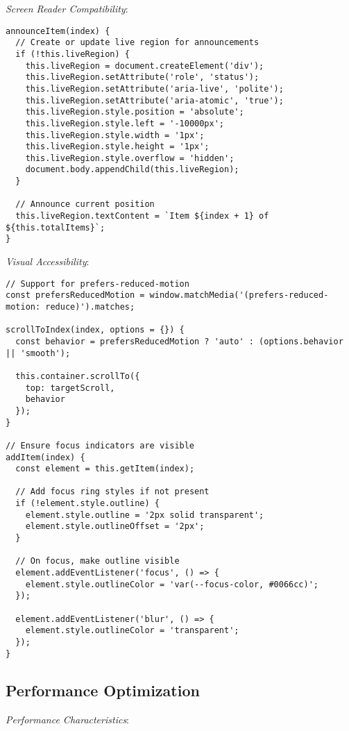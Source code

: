 \documentclass[11pt]{article}
\begin{document}
\emph{Screen Reader Compatibility}:

\begin{verbatim}
announceItem(index) {
  // Create or update live region for announcements
  if (!this.liveRegion) {
    this.liveRegion = document.createElement('div');
    this.liveRegion.setAttribute('role', 'status');
    this.liveRegion.setAttribute('aria-live', 'polite');
    this.liveRegion.setAttribute('aria-atomic', 'true');
    this.liveRegion.style.position = 'absolute';
    this.liveRegion.style.left = '-10000px';
    this.liveRegion.style.width = '1px';
    this.liveRegion.style.height = '1px';
    this.liveRegion.style.overflow = 'hidden';
    document.body.appendChild(this.liveRegion);
  }
  
  // Announce current position
  this.liveRegion.textContent = `Item ${index + 1} of ${this.totalItems}`;
}
\end{verbatim}

\emph{Visual Accessibility}:

\begin{verbatim}
// Support for prefers-reduced-motion
const prefersReducedMotion = window.matchMedia('(prefers-reduced-motion: reduce)').matches;

scrollToIndex(index, options = {}) {
  const behavior = prefersReducedMotion ? 'auto' : (options.behavior || 'smooth');
  
  this.container.scrollTo({
    top: targetScroll,
    behavior
  });
}

// Ensure focus indicators are visible
addItem(index) {
  const element = this.getItem(index);
  
  // Add focus ring styles if not present
  if (!element.style.outline) {
    element.style.outline = '2px solid transparent';
    element.style.outlineOffset = '2px';
  }
  
  // On focus, make outline visible
  element.addEventListener('focus', () => {
    element.style.outlineColor = 'var(--focus-color, #0066cc)';
  });
  
  element.addEventListener('blur', () => {
    element.style.outlineColor = 'transparent';
  });
}
\end{verbatim}
\subsection{Performance Optimization}
\label{sec:org96361df}

\emph{Performance Characteristics}:
\end{document}
